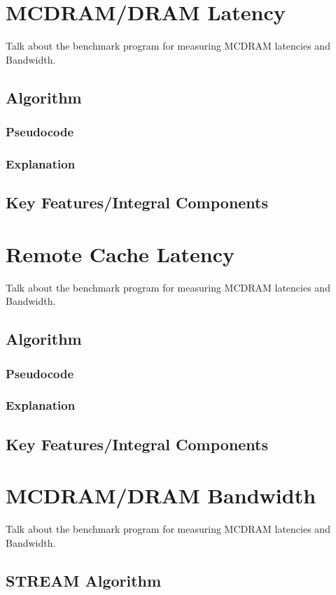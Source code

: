 \documentclass[bsc,frontabs,twoside,singlespacing,parskip,deptreport]{infthesis}     %
\begin{document}
\newpage
\section{MCDRAM/DRAM Latency}\label{mcdram-dram-benchmarks-lat}
Talk about the benchmark program for measuring MCDRAM latencies and Bandwidth.
\subsection{Algorithm}
\subsubsection{Pseudocode}
\subsubsection{Explanation}
\subsection{Key Features/Integral Components}

\newpage
\section{Remote Cache Latency}\label{mcdram-dram-benchmarks}
Talk about the benchmark program for measuring MCDRAM latencies and Bandwidth.
\subsection{Algorithm}
\subsubsection{Pseudocode}
\subsubsection{Explanation}
\subsection{Key Features/Integral Components}

\newpage
\section{MCDRAM/DRAM Bandwidth}\label{mcdram-dram-benchmarks-bw}
Talk about the benchmark program for measuring MCDRAM latencies and Bandwidth.
\subsection{STREAM Algorithm}
\end{document}
